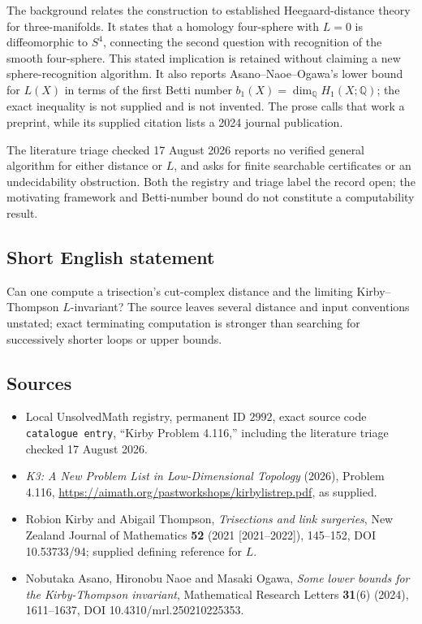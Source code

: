\documentclass[11pt]{article}
\newcommand{\Q}{\mathbb{Q}}
\begin{document}
The background relates the construction to established Heegaard-distance theory for three-manifolds. It states that a homology four-sphere with $L=0$ is diffeomorphic to $S^4$, connecting the second question with recognition of the smooth four-sphere. This stated implication is retained without claiming a new sphere-recognition algorithm. It also reports Asano--Naoe--Ogawa's lower bound for $L(X)$ in terms of the first Betti number $b_1(X)=\dim_{\Q}H_1(X;\Q)$; the exact inequality is not supplied and is not invented. The prose calls that work a preprint, while its supplied citation lists a 2024 journal publication.

The literature triage checked 17 August 2026 reports no verified general algorithm for either distance or $L$, and asks for finite searchable certificates or an undecidability obstruction. Both the registry and triage label the record open; the motivating framework and Betti-number bound do not constitute a computability result.
\subsection{Short English statement}
Can one compute a trisection's cut-complex distance and the limiting Kirby--Thompson $L$-invariant? The source leaves several distance and input conventions unstated; exact terminating computation is stronger than searching for successively shorter loops or upper bounds.
\subsection{Sources}
\begin{itemize}
\item Local UnsolvedMath registry, permanent ID $2992$, exact source code \texttt{catalogue entry}, ``Kirby Problem 4.116,'' including the literature triage checked 17 August 2026.
\item \emph{K3: A New Problem List in Low-Dimensional Topology} (2026), Problem 4.116, \url{https://aimath.org/pastworkshops/kirbylistrep.pdf}, as supplied.
\item [KT22a] Robion Kirby and Abigail Thompson, \emph{Trisections and link surgeries}, New Zealand Journal of Mathematics \textbf{52} (2021 [2021--2022]), 145--152, DOI 10.53733/94; supplied defining reference for $L$.
\item [ANO24] Nobutaka Asano, Hironobu Naoe and Masaki Ogawa, \emph{Some lower bounds for the Kirby-Thompson invariant}, Mathematical Research Letters \textbf{31}(6) (2024), 1611--1637, DOI 10.4310/mrl.250210225353.
\end{itemize}
\end{document}
